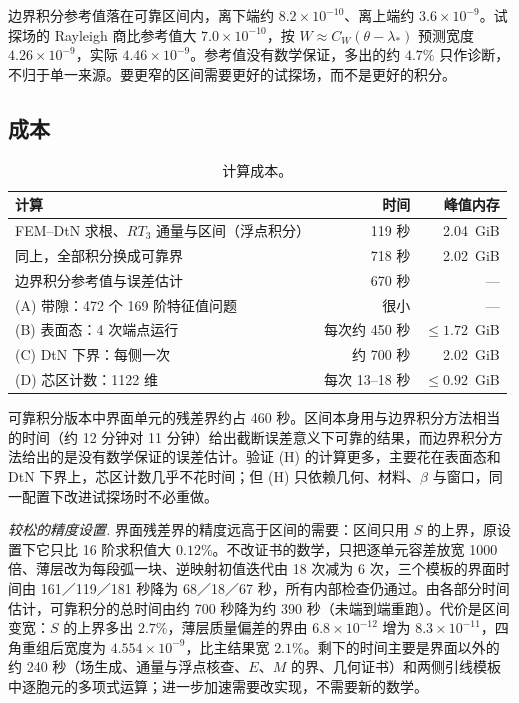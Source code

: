 \documentclass[11pt,a4paper,fontset=fandol]{ctexart}
\theoremstyle{plain}
\theoremstyle{definition}
\theoremstyle{remark}
\begin{document}
边界积分参考值落在可靠区间内，离下端约 $8.2\times10^{-10}$、离上端约 $3.6\times10^{-9}$。试探场的 Rayleigh 商比参考值大 $7.0\times10^{-10}$，按 $W\approx C_W(\theta-\lambda_*)$ 预测宽度 $4.26\times10^{-9}$，实际 $4.46\times10^{-9}$。参考值没有数学保证，多出的约 $4.7\%$ 只作诊断，不归于单一来源。要更窄的区间需要更好的试探场，而不是更好的积分。

\subsection{成本}

\begin{table}[h]
\centering
\small
\caption{计算成本。}
\label{tab:cost}
\begin{tabular}{>{\raggedright\arraybackslash}p{7.2cm}rr}
\toprule
计算 & 时间 & 峰值内存 \\
\midrule
FEM--DtN 求根、$RT_3$ 通量与区间（浮点积分） & 119 秒 & 2.04~GiB \\
同上，全部积分换成可靠界 & 718 秒 & 2.02~GiB \\
边界积分参考值与误差估计 & 670 秒 & — \\
\midrule
(A) 带隙：472 个 169 阶特征值问题 & 很小 & — \\
(B) 表面态：4 次端点运行 & 每次约 450 秒 & $\le1.72$~GiB \\
(C) DtN 下界：每侧一次 & 约 700 秒 & 2.02~GiB \\
(D) 芯区计数：1122 维 & 每次 13--18 秒 & $\le0.92$~GiB \\
\bottomrule
\end{tabular}
\end{table}

可靠积分版本中界面单元的残差界约占 460 秒。区间本身用与边界积分方法相当的时间（约 12 分钟对 11 分钟）给出截断误差意义下可靠的结果，而边界积分方法给出的是没有数学保证的误差估计。验证 (H) 的计算更多，主要花在表面态和 DtN 下界上，芯区计数几乎不花时间；但 (H) 只依赖几何、材料、$\beta$ 与窗口，同一配置下改进试探场时不必重做。

\emph{较松的精度设置.} 界面残差界的精度远高于区间的需要：区间只用 $S$ 的上界，原设置下它只比 16 阶求积值大 $0.12\%$。不改证书的数学，只把逐单元容差放宽 1000 倍、薄层改为每段弧一块、逆映射初值迭代由 18 次减为 6 次，三个模板的界面时间由 161／119／181 秒降为 68／18／67 秒，所有内部检查仍通过。由各部分时间估计，可靠积分的总时间由约 700 秒降为约 390 秒（未端到端重跑）。代价是区间变宽：$S$ 的上界多出 $2.7\%$，薄层质量偏差的界由 $6.8\times10^{-12}$ 增为 $8.3\times10^{-11}$，四角重组后宽度为 $4.554\times10^{-9}$，比主结果宽 $2.1\%$。剩下的时间主要是界面以外的约 240 秒（场生成、通量与浮点核查、$E$、$M$ 的界、几何证书）和两侧引线模板中逐胞元的多项式运算；进一步加速需要改实现，不需要新的数学。
\end{document}
